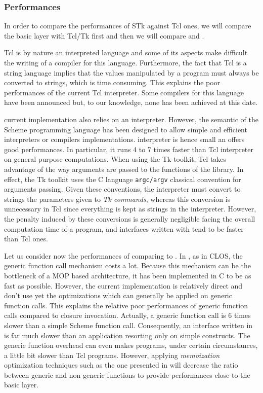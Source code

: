 {\subsubsection{Performances}

In order to compare the performances of STk against Tcl ones, we will
compare the {\stk} basic layer with Tcl/Tk first and then we will
compare {\stk} and {\stklos}. 

Tcl is by nature an interpreted language and some of its aspects make
difficult the writing of a compiler for this language. Furthermore, the
fact that Tcl is a string language implies that the values manipulated by
a program must always be converted to strings, which is time consuming. This
explains the poor performances of the current Tcl interpreter. Some
compilers for this language have been announced but, to our knowledge, none
has been achieved at this date.

{\stk} current implementation also relies on an interpreter. However, the
semantic of the Scheme programming language has been designed to allow
simple and efficient interpreters or compilers implementations. {\stk}
interpreter is hence small an offers good performances. In particular, it
runs 4 to 7 times faster than Tcl interpreter on general purpose
computations. When using the Tk toolkit, Tcl takes advantage of the way
arguments are passed to the functions of the library. In effect, the Tk
toolkit uses the C language \mbox{\tt argc/argv} classical convention for
arguments passing. Given these conventions, the {\stk} interpreter must
convert to strings the parameters given to {\em Tk commands}, whereas this
conversion is unnecessary in Tcl since everything is kept as strings in the
interpreter. However, the penalty induced by these conversions is generally
negligible facing the overall computation time of a program, and interfaces
written with {\stk} tend to be faster than Tcl ones.

Let us consider now the performances of {\stklos} comparing to {\stk}. In
{\stklos}, as in CLOS, the generic function call mechanism costs a
lot. Because this mechanism can be the bottleneck of a MOP based
architecture, it has been implemented in C to be as fast as
possible. However, the current implementation is relatively direct and
don't use yet the optimizations which can generally be applied on generic
function calls. This explains the relative poor performances of generic
function calls compared to closure invocation. Actually, a generic function
call is 6 times slower than a simple Scheme function call. Consequently, an
interface written in {\stklos} is far much slower than an application
resorting only on simple {\stk} constructs. The generic function overhead
can even makes {\stklos} programs, under certain circumstances, a little
bit slower than Tcl programs. However, applying {\em memoization}
optimization techniques such as the one presented in \cite{Kickzales:PCL}
will decrease the ratio between generic and non generic functions to
provide performances close to the basic layer.

}
